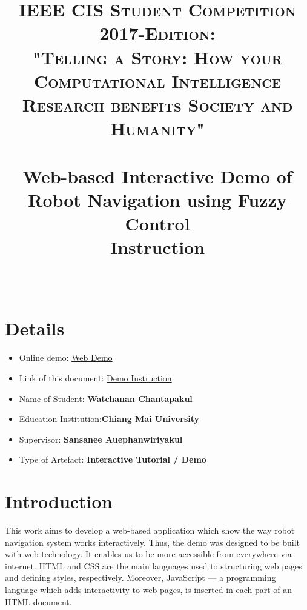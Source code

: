 \documentclass[paper=a4, fontsize=11pt]{scrartcl}
\title{
	\usefont{OT1}{bch}{b}{n}
	\normalfont \normalsize \textsc{IEEE CIS Student Competition 2017-Edition: \\ "Telling a Story: How your Computational Intelligence Research benefits Society and Humanity"} \\ [25pt]
	\horrule{0.5pt} \\[0.4cm]
	\huge Web-based Interactive Demo of Robot Navigation using Fuzzy Control 
	\\\textbf{Instruction}
	\\
	\horrule{2pt} \\[0cm]
}
\date{}
\numberwithin{equation}{section}		%
\numberwithin{figure}{section}			%
\numberwithin{table}{section}				%
\begin{document}
	\maketitle
	
	\section{Details}
	
	\begin{itemize}
		\item Online demo: \href{https://tmwatchanan.github.io/fuzzy-robot-navigation/index.html}{Web Demo}
		\item Link of this document: \href{https://github.com/tmwatchanan/fuzzy-robot-navigation/raw/master/documents/Web-based%20Interactive%20Demo%20of%20Robot%20Navigation%20using%20Fuzzy%20Control.pdf}{Demo Instruction}
		\item Name of Student: \textbf{Watchanan Chantapakul}
		\item Education Institution:\textbf{Chiang Mai University}
		\item Supervisor: \textbf{Sansanee Auephanwiriyakul}
		\item Type of Artefact: \textbf{Interactive Tutorial / Demo}
	\end{itemize}
	
	
	
	\section{Introduction}
	This work aims to develop a web-based application which show the way robot navigation system works interactively. Thus, the demo was designed to be built with web technology. It enables us to be more accessible from everywhere via internet. HTML and CSS are the main languages used to structuring web pages and defining styles, respectively. Moreover, JavaScript --- a programming language which adds interactivity to web pages, is inserted in each part of an HTML document.
	
\end{document}
